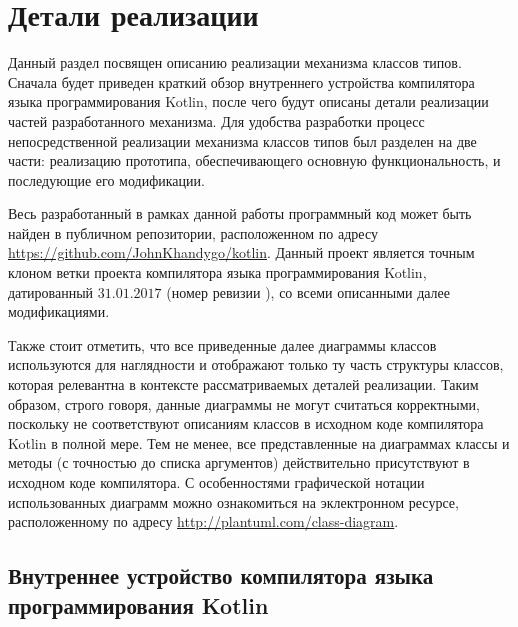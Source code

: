 \chapter{Детали реализации}


Данный раздел посвящен описанию реализации механизма классов типов. Сначала будет приведен краткий обзор внутреннего устройства компилятора языка программирования Kotlin, после чего будут описаны детали реализации частей разработанного механизма. Для удобства разработки процесс непосредственной реализации механизма классов типов был разделен на две части: реализацию прототипа, обеспечивающего основную функциональность, и последующие его модификации. 

Весь разработанный в рамках данной работы программный код может быть найден в публичном репозитории, расположенном по адресу \url{https://github.com/JohnKhandygo/kotlin}. Данный проект является точным клоном ветки  проекта компилятора языка программирования Kotlin, датированный $31.01.2017$ (номер ревизии ), со всеми описанными далее модификациями. 

Также стоит отметить, что все приведенные далее диаграммы классов используются для наглядности и отображают только ту часть структуры классов, которая релевантна в контексте рассматриваемых деталей реализации. Таким образом, строго говоря, данные диаграммы не могут считаться корректными, поскольку не соответствуют описаниям классов в исходном коде компилятора Kotlin в полной мере. Тем не менее, все представленные на диаграммах классы и методы (с точностью до списка аргументов) действительно присутствуют в исходном коде компилятора. С особенностями графической нотации использованных диаграмм можно ознакомиться на эклектронном ресурсе, расположенному по адресу \url{http://plantuml.com/class-diagram}.  


\section{Внутреннее устройство компилятора языка программирования Kotlin}

